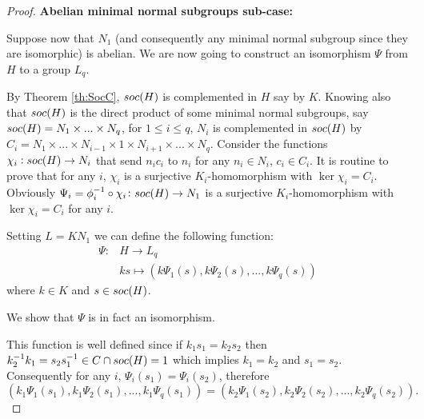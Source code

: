 \begin{proof}
    \vspace{\baselineskip}
    \noindent
    \textbf{Abelian minimal normal subgroups sub-case:}
    \vspace{\baselineskip}

    Suppose now that $N_1$ (and consequently any minimal normal subgroup since they are isomorphic) is abelian. We are now going to construct an isomorphism $\Psi$ from $H$ to a group $L_q$.

    By Theorem \ref{th:SocC}, $soc {(H)}$ is complemented in $H$ say by $K$.
    Knowing also that $soc {(H)}$ is the direct product of some minimal normal subgroups, say $soc {(H)} = N_1 \times...\times N_q$, for $1 \le i \le q$, $N_i$ is complemented in $soc {(H)}$ by $C_i = N_1 \times ... \times N_{i-1} \times 1 \times N_{i+1} \times ... \times N_q$.
    Consider the functions $\chi_i : soc {(H)} \rightarrow N_i$ that send $n_ic_i$ to $n_i$ for any $n_i \in N_i$, $c_i \in C_i$.
    It is routine to prove that for any $i$, $\chi_i$ is a surjective $K_i$-homomorphism with $\ker \chi_i = C_i$.
    Obviously $\Psi_i = \phi_i^{-1} \circ \chi_i \colon soc {(H)} \rightarrow N_1$ is a surjective $K_i$-homomorphism with $\ker \chi_i = C_i$ for any $i$.

    Setting $L=KN_1$ we can define the following function:
    \begin{align*}
        \Psi \colon &H \longrightarrow L_q \\
                 &ks \mapsto  (k\Psi_1(s),k\Psi_2(s),...,k\Psi_q(s))
    \end{align*}
    where $k \in K$ and $s \in soc {(H)}$. 
    
    We show that $\Psi$ is in fact an isomorphism.

    This function is well defined since if $k_1s_1 = k_2s_2$ then $k_2^{-1}k_1 = s_2s_1^{-1} \in C \cap soc {(H)} = 1$ which implies $k_1 = k_2$ and $s_1 = s_2$. 
    Consequently for any $i$, $\Psi_i(s_1) = \Psi_i(s_2)$, therefore $$(k_1\Psi_1(s_1),k_1\Psi_2(s_1),...,k_1\Psi_q(s_1)) = (k_2\Psi_1(s_2),k_2\Psi_2(s_2),...,k_2\Psi_q(s_2)).$$


\end{proof}
